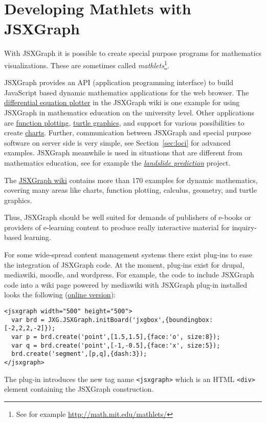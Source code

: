 \documentclass[12pt,a4paper]{article}%
\begin{document}
\section{Developing Mathlets with JSXGraph}
With JSXGraph it is possible to create special purpose programs for mathematics visualizations.
These are sometimes called {\sl mathlets}\footnote{See for example
\href{http://math.mit.edu/mathlets/}{http://math.mit.edu/mathlets/}}.

JSXGraph provides an API (application programming interface) to build JavaScript based 
dynamic mathematics applications for the web browser. 
The \href{http://jsxgraph.uni-bayreuth.de/wiki/index.php/Differential_equations}{differential equation plotter}
in the JSXGraph wiki is one example for using JSXGraph in mathematics 
education on the university level. 
Other applications are 
\href{http://jsxgraph.uni-bayreuth.de/wiki/index.php/Even_simpler_function_plotter}{function plotting}, 
\href{http://jsxgraph.uni-bayreuth.de/wiki/index.php/Programming_turtle_graphics}{turtle graphics}, 
and support for various possibilities to create 
\href{http://jsxgraph.uni-bayreuth.de/wiki/index.php/Category:Charts}{charts}. 
Further, communication between JSXGraph and special purpose software on server side is very simple, see 
Section~\ref{sec:loci} for advanced examples.
JSXGraph meanwhile is used in situations that are different 
from mathematics education, see for example the 
\href{http://www.rhok.org/2010/06/rhok-1-0-washington-d-c-winning-hack-chasm/}{{\sl landslide prediction}}
project.

The \href{http://jsxgraph.uni-bayreuth.de/wiki}{JSXGraph wiki} 
contains more than 170 examples for dynamic mathematics, 
covering many areas like charts, function plotting, calculus, geometry, and turtle graphics.

Thus, JSXGraph should be well suited for demands of publishers of e-books or providers of e-learning 
content to produce really interactive material for inquiry-based learning.

For some wide-spread content management systems there exist plug-ins to ease the integration
of JSXGraph code. 
At the moment, plug-ins exist for drupal, mediawiki, moodle, and wordpress. 
For example, the code to include JSXGraph code into a wiki page powered by mediawiki with JSXGraph plug-in installed
looks the following (\href{http://jsxgraph.uni-bayreuth.de/wiki/index.php/MediaWiki_example}{online version}):

{\footnotesize
\begin{verbatim}
<jsxgraph width="500" height="500">
  var brd = JXG.JSXGraph.initBoard('jxgbox',{boundingbox:[-2,2,2,-2]});
  var p = brd.create('point',[1.5,1.5],{face:'o', size:8});
  var q = brd.create('point',[-1,-0.5],{face:'x', size:5});
  brd.create('segment',[p,q],{dash:3});
</jsxgraph>
\end{verbatim}}
The plug-in introduces the new tag name \verb|<jsxgraph>| which is an HTML \verb|<div>| element
containing the JSXGraph construction.
\end{document}
